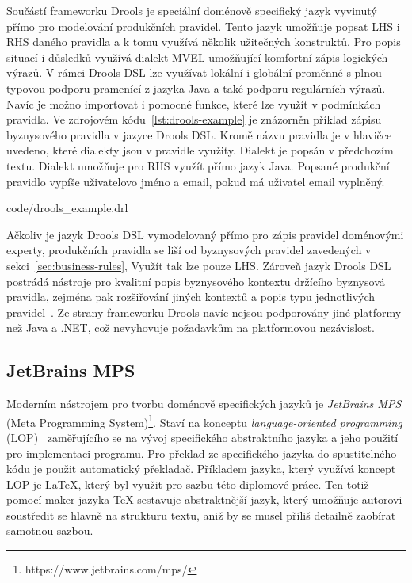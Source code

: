 Součástí frameworku Drools je speciální doménově specifický jazyk vyvinutý přímo
pro modelování produkčních pravidel. Tento jazyk umožňuje popsat \gls{LHS} i \gls{RHS}
daného pravidla a k tomu využívá několik užitečných konstruktů. Pro popis situací i důsledků
využívá dialekt MVEL umožňující komfortní zápis logických výrazů. V rámci Drools \gls{DSL}
lze využívat lokální i globální proměnné s plnou typovou podporu pramenící z jazyka Java a také
podporu regulárních výrazů. Navíc je možno importovat i pomocné funkce, které lze
využít v podmínkách pravidla. Ve zdrojovém kódu~\ref{lst:drools-example} je znázorněn příklad zápisu
byznysového pravidla v jazyce Drools \gls{DSL}. Kromě názvu pravidla je v hlavičce
uvedeno, které dialekty jsou v pravidle využity. Dialekt  je popsán v předchozím textu.
Dialekt  umožňuje pro \gls{RHS} využít přímo jazyk Java. Popsané produkční pravidlo
vypíše uživatelovo jméno a email, pokud má uživatel email vyplněný.


{code/drools_example.drl}

Ačkoliv je jazyk Drools \gls{DSL} vymodelovaný přímo pro zápis pravidel doménovými experty,
produkčních pravidla se liší od byznysových pravidel zavedených v sekci~\ref{sec:business-rules},
Využít tak lze pouze \gls{LHS}. Zároveň jazyk Drools \gls{DSL} postrádá
nástroje pro kvalitní popis byznysového kontextu držícího byznysová pravidla,
zejména pak rozšiřování jiných kontextů a popis typu jednotlivých pravidel~\cite{cemus2017automated}.
Ze strany frameworku Drools navíc nejsou podporovány jiné platformy než Java a .NET, což nevyhovuje
požadavkům na platformovou nezávislost.

\subsection{JetBrains MPS}

Moderním nástrojem pro tvorbu doménově specifických jazyků
je \textit{JetBrains MPS} (Meta Programming System)\footnote{https://www.jetbrains.com/mps/}.
Staví na konceptu \textit{language-oriented programming} (\gls{LOP})~\cite{ward1994language} zaměřujícího
se na vývoj specifického abstraktního jazyka a jeho použití pro implementaci programu. Pro překlad ze specifického
jazyka do spustitelného kódu je použit automatický překladač. Příkladem jazyka, který využívá koncept \gls{LOP}
je \LaTeX\xspace, který byl využit pro sazbu této diplomové práce. Ten totiž pomocí maker jazyka \TeX\xspace
sestavuje abstraktnější jazyk, který umožňuje autorovi soustředit se hlavně na strukturu textu, aniž by
se musel příliš detailně zaobírat samotnou sazbou.

